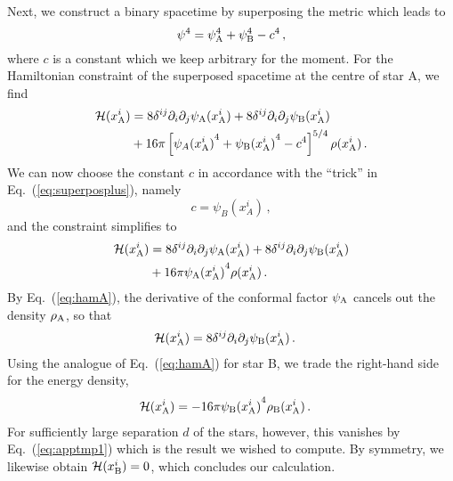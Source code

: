 \documentclass[]{iopart}
\begin{document}
Next, we construct a binary spacetime by superposing the metric
which leads to
%
\begin{equation}
    \psi^4 = \psi_{\rm A}^4 + \psi_{\rm B}^4-c^4\,,
\end{equation}
%
where $c$ is a constant which we keep arbitrary for the moment.
For the Hamiltonian constraint of the superposed spacetime
at the centre of star A, we find
%
\begin{equation}
\begin{aligned}
    \mathcal{H}(x_{\rm A}^{i}) &=  8 \delta^{ij} \partial_i\partial_j{\psi_{\rm A}({x_{\rm A}^{i}})} + 8 \delta^{ij} \partial_i\partial_j{\psi_{\rm B}({x_{\rm A}^{i}})}\\ &+  16\pi \left[{\psi_{A}({x_{\rm A}^{i}})}^4 + {\psi_{\rm B}({x_{\rm A}^{i}})}^4-c^4\right]^{5/4}\rho(x_{\rm A}^{i})\,.
\end{aligned}
\end{equation}
%
We can now choose the constant $c$ in
accordance with the ``trick'' in Eq.~(\ref{eq:superposplus}),
namely
%
\begin{equation}
   c = \psi_B(x_A^{i})\,,
\end{equation}
%
and the constraint simplifies to
\begin{equation}
\begin{aligned}
    \mathcal{H}(x_{\rm A}^{i}) &=  8 \delta^{ij} \partial_i\partial_j{\psi_{\rm A}({x_{\rm A}^{i}})} + 8 \delta^{ij} \partial_i\partial_j{\psi_{\rm B}({x_{\rm A}^{i}})}\\ &+  16\pi {\psi_{\rm A}({x_{\rm A}^{i}})}^4 \rho(x_{\rm A}^{i})\,.
\end{aligned}
\end{equation}
%
By Eq.~(\ref{eq:hamA}), the derivative of the conformal factor
$\psi_{\rm A}$ cancels out the density $\rho_{\rm A}$,
so that
%
\begin{equation}
\begin{aligned}
    \mathcal{H}(x_{\rm A}^{i}) &=   8 \delta^{ij} \partial_i\partial_j{\psi_{\rm B}({x_{\rm A}^{i}})}\,.
\end{aligned}
\end{equation}
%
Using the analogue of Eq.~(\ref{eq:hamA}) for star B, we trade
the right-hand side for the energy density,
%
\begin{equation}
\begin{aligned}
    \mathcal{H}(x_{\rm A}^{i}) &=   - 16\pi {\psi_{\rm B}({x_{\rm A}^{i}})}^4 \rho_{\rm B}(x_{\rm A}^{i})\,.
\end{aligned}
\end{equation}
%
For sufficiently large separation $d$ of the stars, however,
this vanishes by Eq.~(\ref{eq:apptmp1}) which is the result
we wished to compute. By symmetry, we likewise obtain
$\mathcal{H}(x_{\rm B}^i)=0$, which concludes our calculation.
\end{document}
